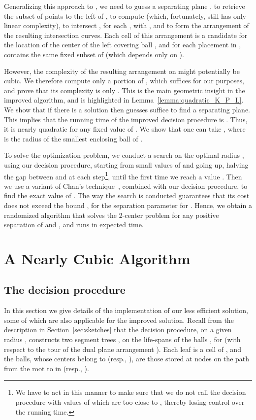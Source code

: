 \documentclass[a4paper,12pt]{article}
\begin{document}
Generalizing this approach to , we need to guess a separating plane , to retrieve the subset  of points to the left of , to compute  (which, fortunately, still has only linear complexity), to intersect , for each , with , and to form the arrangement of the resulting intersection curves. Each cell of this arrangement is a candidate for the location of the center of the left covering ball , and for each placement in ,  contains the same fixed subset of  (which depends only on ).

However, the complexity of the resulting arrangement  on
 might potentially be cubic. We therefore compute only
a portion  of , which suffices for our purposes, and prove
that its complexity is only . This is the main geometric
insight in the improved algorithm, and is highlighted in
Lemma~\ref{lemma:quadratic_K_P_L}. We show that if there is a
solution then  guesses suffice to find a separating
plane. This implies that the running time of the improved decision
procedure is . Thus, it is nearly
quadratic for any fixed value of . We show that one can take
, where  is the radius of the smallest
enclosing ball of .

To solve the optimization problem, we conduct a search on the
optimal radius , using our decision procedure, starting from
small values of  and going up, halving the gap between  and
 at each step\footnote{\small We have to act in this manner to
make sure that we do not call the decision procedure with values of
 which are too close to , thereby losing control over the
running time.}, until the first time we reach a value .
Then we use a variant of Chan's technique~\cite{TCG}, combined with
our decision procedure, to find the exact value of . The way
the search is conducted guarantees that its cost does not exceed the
bound , for the separation parameter
 for . Hence, we obtain a randomized
algorithm that solves the 2-center problem for any positive
separation of  and , and runs in  expected time.



\section{A Nearly Cubic Algorithm}
\label{sec:cubic_alg}

\subsection{The decision procedure}
\label{subsec:decision_procedure} In this section we give details of
the implementation of our less efficient solution, some of which are
also applicable for the improved solution. Recall from the
description in Section~\ref{sec:sketches} that the decision
procedure, on a given radius , constructs two segment trees , on the life-spans of the balls , for  (with
respect to the tour of the dual plane arrangement ). Each leaf
is a cell  of , and the balls, whose centers belong to
 (resp., ), are those stored at nodes on the
path from the root to  in  (resp., ).
\end{document}
